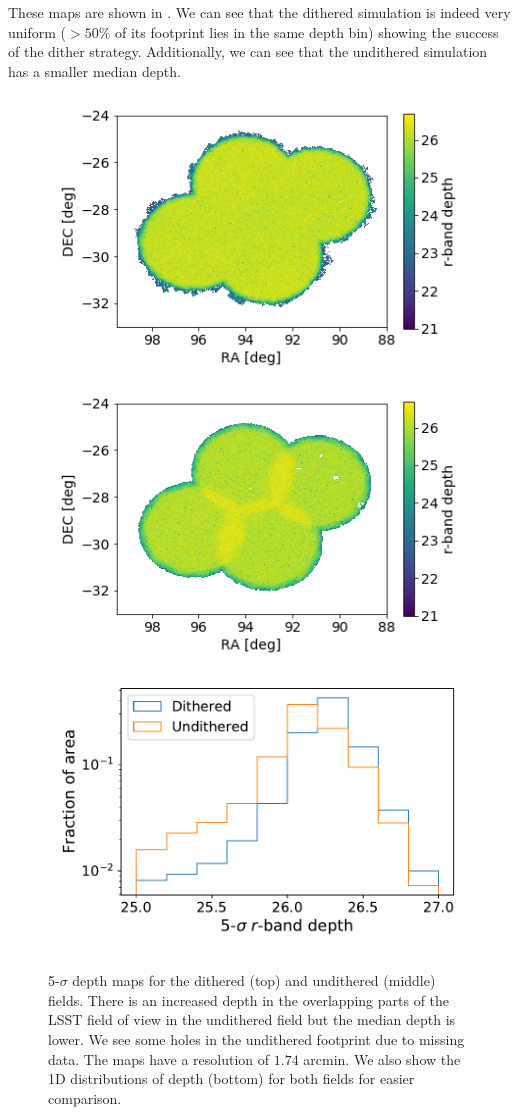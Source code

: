 \documentclass[a4paper,fleqn,usenatbib]{mnras}
\begin{document}
These maps are shown in . We can see that the dithered simulation is indeed very uniform ($> 50\%$ of its footprint lies in the same depth bin) showing the success of the dither strategy. Additionally, we can see that the undithered simulation has a smaller median depth.
\begin{figure}
\centering
\includegraphics[width=0.85\columnwidth]{dithered_depth.png}
\includegraphics[width=0.85\columnwidth]{undithered_depth.png}
\includegraphics[width=0.85\columnwidth]{depth_comparison_1d.pdf}
\caption{5-$\sigma$ depth maps for the dithered (top) and undithered (middle) fields. There is an increased depth in the overlapping parts of the LSST field of view in the undithered field but the median depth is lower. We see some holes in the undithered footprint due to missing data. The maps have a resolution of $1.74$ arcmin. We also show the 1D distributions of depth (bottom) for both fields for easier comparison.}
\label{fig:depth_maps}
\end{figure}
\end{document}
